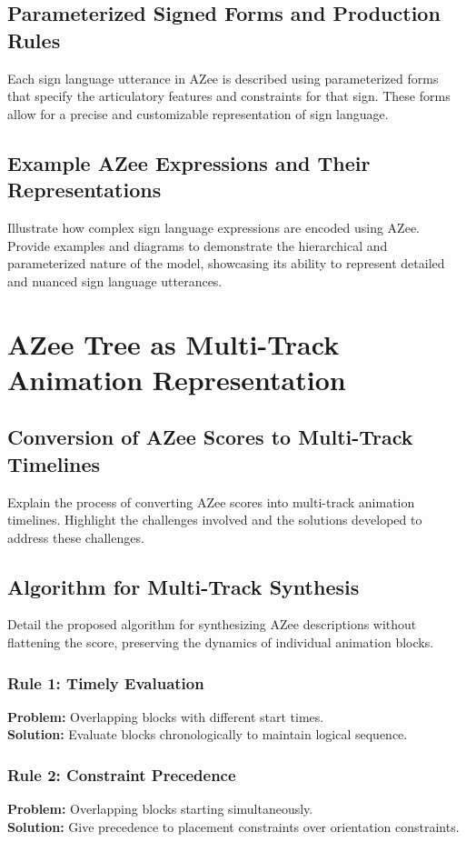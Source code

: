 \documentclass[../../main.tex]{subfiles}
\begin{document}
\subsection{Parameterized Signed Forms and Production Rules}
Each sign language utterance in AZee is described using parameterized forms that specify the articulatory features and constraints for that sign. These forms allow for a precise and customizable representation of sign language.

\subsection{Example AZee Expressions and Their Representations}
Illustrate how complex sign language expressions are encoded using AZee. Provide examples and diagrams to demonstrate the hierarchical and parameterized nature of the model, showcasing its ability to represent detailed and nuanced sign language utterances.

\section{AZee Tree as Multi-Track Animation Representation}

\subsection{Conversion of AZee Scores to Multi-Track Timelines}
Explain the process of converting AZee scores into multi-track animation timelines. Highlight the challenges involved and the solutions developed to address these challenges.

\subsection{Algorithm for Multi-Track Synthesis}
Detail the proposed algorithm for synthesizing AZee descriptions without flattening the score, preserving the dynamics of individual animation blocks.

\subsubsection{Rule 1: Timely Evaluation}
\textbf{Problem:} Overlapping blocks with different start times.\\
\textbf{Solution:} Evaluate blocks chronologically to maintain logical sequence.

\subsubsection{Rule 2: Constraint Precedence}
\textbf{Problem:} Overlapping blocks starting simultaneously.\\
\textbf{Solution:} Give precedence to placement constraints over orientation constraints.
\end{document}
